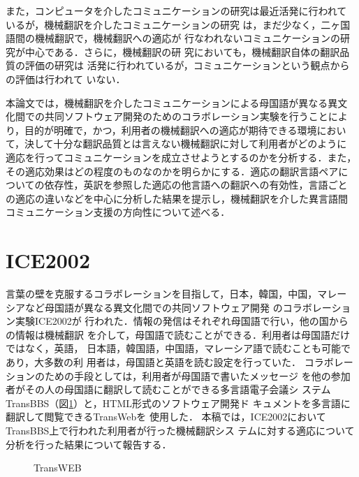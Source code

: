 また，コンピュータを介したコミュニケーションの研究は最近活発に行われて
いるが\cite{Herring}，機械翻訳を介したコミュニケーションの研究
\cite{Miike}は，まだ少なく，二ヶ国語間の機械翻訳で，機械翻訳への適応が
行なわれないコミュニケーションの研究が中心である．さらに，機械翻訳の研
究においても，機械翻訳自体の翻訳品質の評価の研究\cite{Hovy,Papineni}は
活発に行われているが，コミュニケーションという観点からの評価は行われて
いない．

本論文では，機械翻訳を介したコミュニケーションによる母国語が異なる異文
化間での共同ソフトウェア開発のためのコラボレーション実験を行うことによ
り，目的が明確で，かつ，利用者の機械翻訳への適応が期待できる環境におい
て，決して十分な翻訳品質とは言えない機械翻訳に対して利用者がどのように
適応を行ってコミュニケーションを成立させようとするのかを分析する．また，
その適応効果はどの程度のものなのかを明らかにする．適応の翻訳言語ペアに
ついての依存性，英訳を参照した適応の他言語への翻訳への有効性，言語ごと
の適応の違いなどを中心に分析した結果を提示し，機械翻訳を介した異言語間
コミュニケーション支援の方向性について述べる．

\section{ICE2002}
\label{sec:ICE2002}

言葉の壁を克服するコラボレーションを目指して，日本，韓国，中国，マレー
シアなど母国語が異なる異文化間での共同ソフトウェア開発\cite{Othmann:2003HCI}
のコラボレーション実験ICE2002\cite{野村:2003情報処理,Nomura:2003HCI}が
行われた．情報の発信はそれぞれ母国語で行い，他の国からの情報は機械翻訳
を介して，母国語で読むことができる．利用者は母国語だけではなく，英語，
日本語，韓国語，中国語，マレーシア語で読むことも可能であり，大多数の利
用者は，母国語と英語を読む設定を行っていた．
コラボレーションのための手段としては，利用者が母国語で書いたメッセージ
を他の参加者がその人の母国語に翻訳して読むことができる多言語電子会議シ
ステムTransBBS（図\ref{fig:ICE2002}）と，HTML形式のソフトウェア開発ド
キュメントを多言語に翻訳して閲覧できるTransWebを
使用した\cite{船越:2004,Funakoshi:2003HCI}．
本稿では，ICE2002においてTransBBS上で行われた利用者が行った機械翻訳シス
テムに対する適応\cite{Ogura:2004}について分析を行った結果について報告する．

\begin{figure}[tb]
 \begin{center}
 \end{center}
 \vspace*{-3mm}
 \caption{TransWEB}
 \label{fig:ICE2002}
\end{figure}

